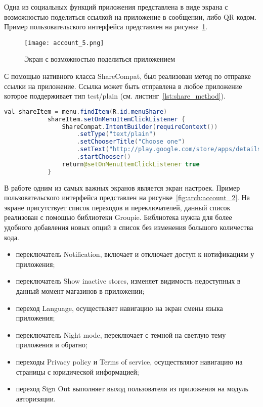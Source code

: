 Одна из социальных функций приложения представлена в виде экрана с возможностью поделиться ссылкой на приложение в сообщении, либо QR кодом. Пример пользовательского интерфейса представлен на рисунке~\ref{fig:arch:account_5}.

\begin{figure}[H]
 \centering
   \texttt{[image: account\_5.png]} 
   \caption{Экран с возможностью поделиться приложением}
   \label{fig:arch:account_5}
\end{figure}

С помощью нативного класса ShareCompat, был реализован метод по отправке ссылки на приложение. Ссылка может быть отправлена в любое приложение которое поддерживает тип test/plain (см. листинг~\ref{lst:share_method}).
\begin{lstlisting}[language=Java,label={lst:share_method},caption={Методы для отправки ссылки на приложение}]
            val shareItem = menu.findItem(R.id.menuShare)
            shareItem.setOnMenuItemClickListener {
                ShareCompat.IntentBuilder(requireContext())
                    .setType("text/plain")
                    .setChooserTitle("Choose one")
                    .setText("http://play.google.com/store/apps/details?id=" + requireActivity().packageName)
                    .startChooser()
                return@setOnMenuItemClickListener true
            }
\end{lstlisting}

В работе одним из самых важных экранов является экран настроек. Пример пользовательского интерфейса представлен на рисунке~\ref{fig:arch:account_2}. На экране присутствует список переходов и переключателей, данный список реализован с помощью библиотеки Groupie. Библиотека нужна для более удобного добавления новых опций в список без изменения большого количества кода.

\begin{itemize}
    \item переключатель Notification, включает и отключает доступ к нотификациям у приложения;
    \item переключатель Show inactive stores, изменяет видимость недоступных в данный момент магазинов в приложении;
    \item переход Language, осуществляет навигацию на экран смены языка приложения;
    \item переключатель Night mode, переключает с темной на светлую тему приложения и обратно;
    \item переходы Privacy policy и Terms of service, осуществляют навигацию на страницы с юридической информацией;
    \item переход Sign Out выполняет выход пользователя из приложения на модуль авторизации.
\end{itemize}

